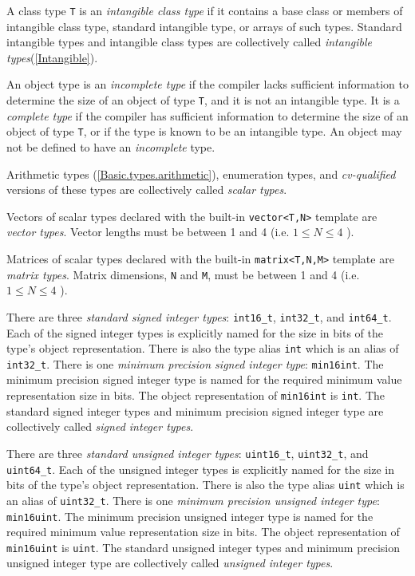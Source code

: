 \p A class type \texttt{T} is an \textit{intangible class type} if it contains
a base class or members of intangible class type, standard intangible type,
or arrays of such types. Standard intangible types and intangible class types
are collectively called \textit{intangible types}(\ref{Intangible}).

\p An object type is an \textit{incomplete type} if the compiler lacks
sufficient information to determine the size of an object of type \texttt{T},
and it is not an intangible type. It is a \textit{complete type} if the compiler
has sufficient information to determine the size of an object of type
\texttt{T}, or if the type is known to be an intangible type. An object may not
be defined to have an \textit{incomplete} type.

\p Arithmetic types (\ref{Basic.types.arithmetic}), enumeration types, and
\textit{cv-qualified} versions of these types are collectively called
\textit{scalar types}.

\p Vectors of scalar types declared with the built-in \texttt{vector<T,N>}
template are \textit{vector types}. Vector lengths must be between 1 and 4 (i.e.
\( 1 \leq N \leq 4 \) ).

\p Matrices of scalar types declared with the built-in \texttt{matrix<T,N,M>}
template are \textit{matrix types}. Matrix dimensions, \texttt{N} and
\texttt{M}, must be between 1 and 4 (i.e. \( 1 \leq N \leq 4 \) ).


\p There are three \textit{standard signed integer types}: \texttt{int16\_t},
\texttt{int32\_t}, and \texttt{int64\_t}. Each of the signed integer types is
explicitly named for the size in bits of the type's object representation. There
is also the type alias \texttt{int} which is an alias of \texttt{int32\_t}.
There is one \textit{minimum precision signed integer type}: \texttt{min16int}.
The minimum precision signed integer type is named for the required minimum
value representation size in bits. The object representation of
\texttt{min16int} is \texttt{int}. The standard signed integer types and minimum
precision signed integer type are collectively called \textit{signed integer
types}.

\p There are three \textit{standard unsigned integer types}: \texttt{uint16\_t},
\texttt{uint32\_t}, and \texttt{uint64\_t}. Each of the unsigned integer types
is explicitly named for the size in bits of the type's object representation.
There is also the type alias \texttt{uint} which is an alias of
\texttt{uint32\_t}. There is one \textit{minimum precision unsigned integer
type}: \texttt{min16uint}. The minimum precision unsigned integer type is named
for the required minimum value representation size in bits. The object
representation of \texttt{min16uint} is \texttt{uint}. The standard unsigned
integer types and minimum precision unsigned integer type are collectively
called \textit{unsigned integer types}.

